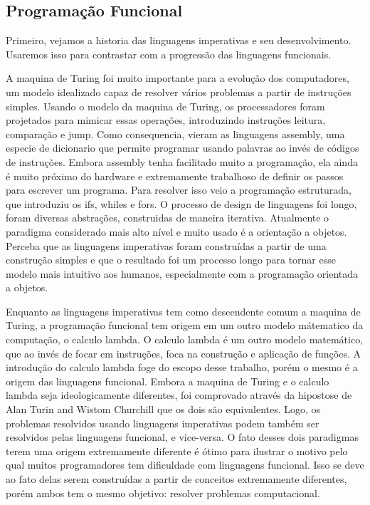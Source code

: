 \subsection{Programação Funcional}

Primeiro, vejamos a historia das linguagens imperativas e seu desenvolvimento.
Usaremos isso para contrastar com a progressão das linguagens funcionais.

A maquina de Turing foi muito importante para a evolução dos computadores, um modelo idealizado capaz de resolver vários problemas a partir de instruções simples.
Usando o modelo da maquina de Turing, os processadores foram projetados para mimicar essas operações, introduzindo instruções leitura, comparação e jump.
Como consequencia, vieram as linguagens assembly, uma especie de dicionario que permite programar usando palavras ao invés de códigos de instruções.
Embora assembly tenha facilitado muito a programação, ela ainda é muito próximo do hardware e extremamente trabalhoso de definir os passos para escrever um programa.
Para resolver isso veio a programação estruturada, que introduziu os ifs, whiles e fors.
O processo de design de linguagens foi longo, foram diversas abstrações, construidas de maneira iterativa.
Atualmente o paradigma considerado mais alto nível e muito usado é a orientação a objetos.
Perceba que as linguagens imperativas foram construídas a partir de uma construção simples e que o resultado foi um processo longo para tornar esse modelo mais intuitivo aos humanos, especialmente com a programação orientada a objetos.

Enquanto as linguagens imperativas tem como descendente comum a maquina de Turing, a programação funcional tem origem em um outro modelo mátematico da computação, o calculo lambda.
O calculo lambda é um outro modelo matemático, que ao invés de focar em instruções, foca na construção e aplicação de funções.
A introdução do calculo lambda foge do escopo desse trabalho, porém o mesmo é a origem das linguagens funcional.
Embora a maquina de Turing e o calculo lambda seja ideologicamente diferentes, foi comprovado através da hipostose de Alan Turin and Wistom Churchill que os dois são equivalentes.
Logo, os problemas resolvidos usando linguagens imperativas podem também ser resolvidos pelas linguagens funcional, e vice-versa.
O fato desses dois paradigmas terem uma origem extremamente diferente é ótimo para ilustrar o motivo pelo qual muitos programadores tem dificuldade com linguagens funcional.
Isso se deve ao fato delas serem construídas a partir de conceitos extremamente diferentes, porém ambos tem o mesmo objetivo: resolver problemas computacional.

